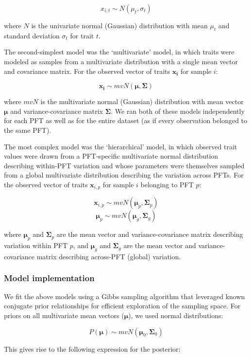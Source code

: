 $$x_{i,t} \sim N(\mu_t, \sigma_t)$$

where $N$ is the univariate normal (Gaussian) distribution with mean $\mu_t$ and standard deviation $\sigma_t$ for trait $t$.

The second-simplest model was the ‘multivariate’ model, in which traits were modeled as samples from a multivariate distribution with a single mean vector and covariance matrix.
For the observed vector of traits ${\mathbf{x_i}}$ for sample $i$:

$$\mathbf{x_i} \sim mvN(\mathbf{\mu}, \mathbf{\Sigma})$$

where $mvN$ is the multivariate normal (Gaussian) distribution with mean vector $\mathbf{\mu}$ and variance-covariance matrix $\mathbf{\Sigma}$.
We ran both of these models independently for each PFT as well as for the entire dataset (as if every observation belonged to the same PFT).

The most complex model was the ‘hierarchical’ model, in which observed trait values were drawn from a PFT-specific multivariate normal distribution describing within-PFT variation and whose parameters were themselves sampled from a global multivariate distribution describing the variation across PFTs.
For the observed vector of traits $\mathbf{x}_{i,p}$ for sample $i$ belonging to PFT $p$:

$$\mathbf{x}_{i,p} \sim mvN(\mathbf{\mu}_p, \mathbf{\Sigma}_p)$$
$$\mathbf{\mu}_p \sim mvN(\mathbf{\mu}_g, \mathbf{\Sigma}_g)$$

where $\mathbf{\mu}_p$ and $\mathbf{\Sigma}_p$ are the mean vector and variance-covariance matrix describing variation within PFT $p$, and $\mathbf{\mu}_g$ and $\mathbf{\Sigma}_g$ are the mean vector and variance-covariance matrix describing across-PFT (global) variation.


\subsubsection{Model implementation}

We fit the above models using a Gibbs sampling algorithm that leveraged known conjugate prior relationships for efficient exploration of the sampling space.
For priors on all multivariate mean vectors ($\mathbf{\mu}$), we used normal distributions:

$$P(\mathbf{\mu}) \sim mvN(\mathbf{\mu}_0, {\mathbf{\Sigma}}_0)$$

This gives rise to the following expression for the posterior:

